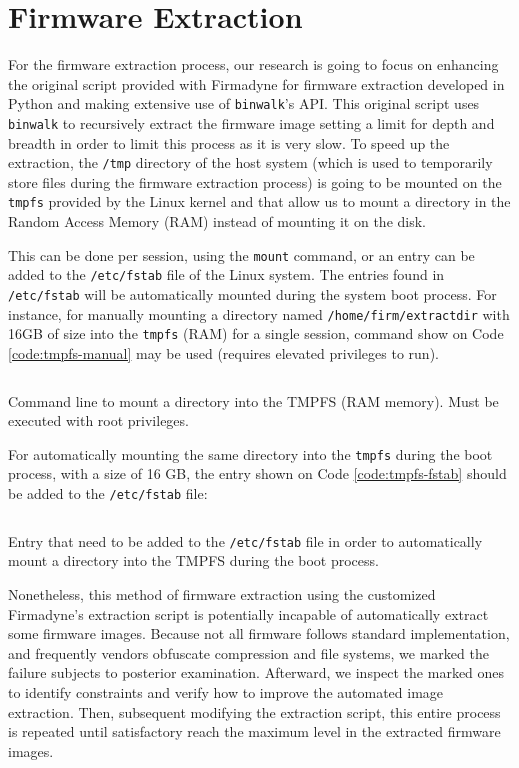 \section{Firmware Extraction}
\label{sec:extraction}

For the firmware extraction process, our research is going to focus on enhancing the original script provided with Firmadyne \cite{firmadyne} for firmware extraction developed in Python and making extensive use of {\tt binwalk}'s API. This original script uses {\tt binwalk} to recursively extract the firmware image setting a limit for depth and breadth in order to limit this process as it is very slow. To speed up the extraction, the {\tt /tmp} directory of the host system (which is used to temporarily store files during the firmware extraction process) is going to be mounted on the {\tt tmpfs} provided by the Linux kernel and that allow us to mount a directory in the Random Access Memory (RAM) instead of mounting it on the disk.

This can be done per session, using the {\tt mount} command, or an entry can be added to the {\tt /etc/fstab} file of the Linux system. The entries found in {\tt /etc/fstab} will be automatically mounted during the system boot process. For instance, for manually mounting a directory named {\tt /home/firm/extractdir} with 16GB of size into the {\tt tmpfs} (RAM) for a single session, command show on Code \ref{code:tmpfs-manual} may be used (requires elevated privileges to run).

\begin{listing}[H]
\inputminted[breaklines]{text}{Code/tmpfs-mount}
\caption{Command line to mount a directory into the TMPFS (RAM memory). Must be executed with root privileges.}
\label{code:tmpfs-manual}
\end{listing}

For automatically mounting the same directory into the {\tt tmpfs} during the boot process, with a size of 16 GB, the entry shown on Code \ref{code:tmpfs-fstab} should be added to the {\tt /etc/fstab} file:

\begin{listing}[H]
\inputminted[breaklines]{text}{Code/tmpfs-fstab}
\caption{Entry that need to be added to the {\tt /etc/fstab} file in order to automatically mount a directory into the TMPFS during the boot process.}
\label{code:tmpfs-fstab}
\end{listing}

Nonetheless, this method of firmware extraction using the customized Firmadyne's \cite{firmadyne} extraction script is potentially incapable of automatically extract some firmware images. Because not all firmware follows standard implementation, and frequently vendors obfuscate compression and file systems, we marked the failure subjects to posterior examination. Afterward, we inspect the marked ones to identify constraints and verify how to improve the automated image extraction. Then, subsequent modifying the extraction script, this entire process is repeated until satisfactory reach the maximum level in the extracted firmware images.

